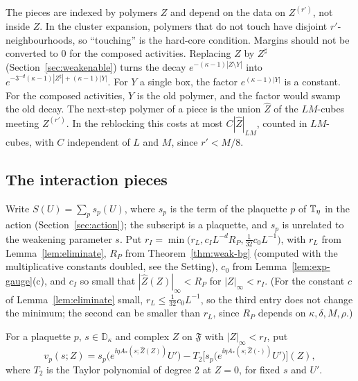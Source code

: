 \begin{remark}[Margins]\label{rem:localization-margins}
The pieces are indexed by polymers $Z$ and depend on the data on $Z^{(r')}$, not inside $Z$. In the cluster expansion, polymers that do not touch have disjoint $r'$-neighbourhoods, so ``touching'' is the hard-core condition. Margins should not be converted to $0$ for the composed activities. Replacing $Z$ by $Z^\sharp$ (Section~\ref{sec:weakenable}) turns the decay $e^{-(\kappa-1)|Z\setminus Y|}$ into $e^{-3^{-d}(\kappa-1)|Z^\sharp|+(\kappa-1)|Y|}$. For $Y$ a single box, the factor $e^{(\kappa-1)|Y|}$ is a constant. For the composed activities, $Y$ is the old polymer, and the factor would swamp the old decay. The next-step polymer of a piece is the union $\hat Z$ of the $LM$-cubes meeting $Z^{(r')}$. In the reblocking this costs at most $C|\hat Z|_{LM}$, counted in $LM$-cubes, with $C$ independent of $L$ and $M$, since $r'<M/8$.
\end{remark}

\subsection{The interaction pieces}\label{subsec:sq-interaction}

Write $S(U)=\sum_ps_p(U)$, where $s_p$ is the term of the plaquette $p$ of $\mathbb T_\eta$ in the action (Section~\ref{sec:action}); the subscript is a plaquette, and $s_p$ is unrelated to the weakening parameter $s$. Put $r_I=\min\big(r_L,c_IL^{-d}R_P,\frac1{32}c_0L^{-1}\big)$, with $r_L$ from Lemma~\ref{lem:eliminate}, $R_P$ from Theorem~\ref{thm:weak-bg} (computed with the multiplicative constants doubled, see the Setting), $c_0$ from Lemma~\ref{lem:exp-gauge}(c), and $c_I$ so small that $|\hat Z(Z)|_\infty<R_P$ for $|Z|_\infty<r_I$. (For the constant $c$ of Lemma~\ref{lem:eliminate} small, $r_L\le\frac1{32}c_0L^{-1}$, so the third entry does not change the minimum; the second can be smaller than $r_L$, since $R_P$ depends on $\kappa,\delta,M,\rho$.)

\begin{definition}\label{def:interaction-pieces}
For a plaquette $p$, $s\in\mathbb D_\kappa$ and complex $Z$ on $\mathfrak F$ with $|Z|_\infty<r_I$, put
\[
v_p(s;Z)=s_p\big(e^{\ii\eta A_*(s;\hat Z(Z))}U'\big)-T_2\big[s_p\big(e^{\ii\eta A_*(s;\hat Z(\cdot))}U'\big)\big](Z),
\]
where $T_2$ is the Taylor polynomial of degree $2$ at $Z=0$, for fixed $s$ and $U'$.
\end{definition}

